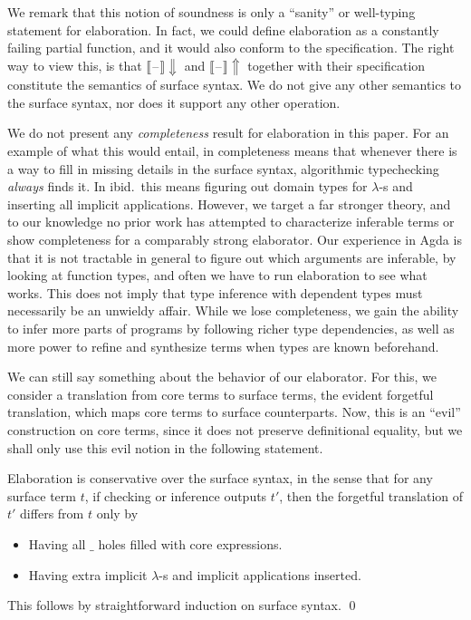 \documentclass[acmsmall,review,anonymous,prologue,dvipsnames]{acmart}\settopmatter{printfolios=true,printccs=false,printacmref=false}
\newcommand{\blank}{\mathord{\hspace{1pt}\text{--}\hspace{1pt}}}
\newcommand{\echeckblank}{\llbracket\blank\rrbracket\!\Downarrow}
\newcommand{\einferblank}{\llbracket\blank\rrbracket\!\Uparrow}
\theoremstyle{remark}
\begin{document}
We remark that this notion of soundness is only a ``sanity'' or well-typing
statement for elaboration. In fact, we could define elaboration as a constantly
failing partial function, and it would also conform to the specification. The
right way to view this, is that $\echeckblank$ and $\einferblank$ together
with their specification constitute the semantics of surface syntax. We do not
give any other semantics to the surface syntax, nor does it support any other
operation.

We do not present any \emph{completeness} result for elaboration in this
paper. For an example of what this would entail, in \cite{dunfield2013complete}
completeness means that whenever there is a way to fill in missing details in
the surface syntax, algorithmic typechecking \emph{always} finds it. In
ibid.\ this means figuring out domain types for $\lambda$-s and inserting all
implicit applications. However, we target a far stronger theory, and to our
knowledge no prior work has attempted to characterize inferable terms or show
completeness for a comparably strong elaborator. Our experience in Agda is that
it is not tractable in general to figure out which arguments are inferable, by
looking at function types, and often we have to run elaboration to see what
works. This does not imply that type inference with dependent types must
necessarily be an unwieldy affair. While we lose completeness, we gain the
ability to infer more parts of programs by following richer type dependencies,
as well as more power to refine and synthesize terms when types are known
beforehand.

We can still say something about the behavior of our elaborator. For this, we
consider a translation from core terms to surface terms, the evident forgetful
translation, which maps core terms to surface counterparts. Now, this is an
``evil'' construction on core terms, since it does not preserve definitional
equality, but we shall only use this evil notion in the following statement.

\begin{theorem}[Conservativity]\label{thm:conservativity}
Elaboration is conservative over the surface syntax, in the sense that for any
surface term $t$, if checking or inference outputs $t'$, then the forgetful
translation of $t'$ differs from $t$ only by
  \begin{itemize}
    \item Having all $\_$ holes filled with core expressions.
    \item Having extra implicit $\lambda$-s and implicit applications inserted.
  \end{itemize}
This follows by straightforward induction on surface syntax. \qed
\end{theorem}
\end{document}
